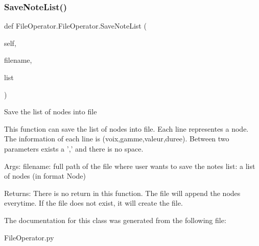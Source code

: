 \subsubsection{\texorpdfstring{Save\+Note\+List()}{SaveNoteList()}}
{\footnotesize\ttfamily def File\+Operator.\+File\+Operator.\+Save\+Note\+List (\begin{DoxyParamCaption}\item[{}]{self,  }\item[{}]{filename,  }\item[{}]{list }\end{DoxyParamCaption})}

\begin{DoxyVerb}Save the list of nodes into file

This function can save the list of nodes into file. Each line representes
a node. The information of each line is (voix,gamme,valeur,duree). Between
two parameters exists a ',' and there is no space.

Args:
    filename: full path of the file where user wants to save the notes
    list: a list of nodes (in format Node)

Returns:
    There is no return in this function. The file will append the nodes
    everytime. If the file does not exist, it will create the file.
\end{DoxyVerb}
 

The documentation for this class was generated from the following file\+:\begin{DoxyCompactItemize}
\item 
File\+Operator.\+py\end{DoxyCompactItemize}
